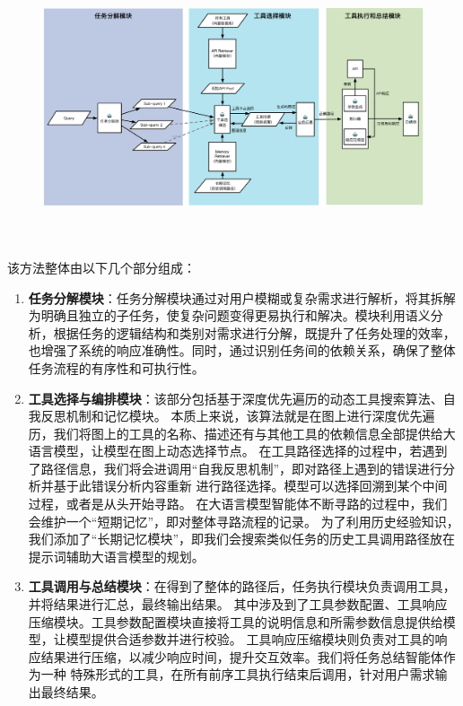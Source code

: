 \begin{figure}[!htp]
  \vspace{1em}
  \centering
  \setlength{\abovecaptionskip}{10pt} %
  \includegraphics[height=8cm]{../assets/ch4-整体框架图-3.pdf}
  \label{fig:ch4-framework}
\end{figure}

该方法整体由以下几个部分组成：

\begin{enumerate}
  \item \textbf{任务分解模块}：任务分解模块通过对用户模糊或复杂需求进行解析，将其拆解为明确且独立的子任务，使复杂问题变得更易执行和解决。模块利用语义分析，根据任务的逻辑结构和类别对需求进行分解，既提升了任务处理的效率，也增强了系统的响应准确性。同时，通过识别任务间的依赖关系，确保了整体任务流程的有序性和可执行性。
  \item \textbf{工具选择与编排模块}：该部分包括基于深度优先遍历的动态工具搜索算法、自我反思机制和记忆模块。
  本质上来说，该算法就是在图上进行深度优先遍历，我们将图上的工具的名称、描述还有与其他工具的依赖信息全部提供给大语言模型，让模型在图上动态选择节点。
  在工具路径选择的过程中，若遇到了路径信息，我们将会进调用“自我反思机制”，即对路径上遇到的错误进行分析并基于此错误分析内容重新
  进行路径选择。模型可以选择回溯到某个中间过程，或者是从头开始寻路。
  在大语言模型智能体不断寻路的过程中，我们会维护一个“短期记忆”，即对整体寻路流程的记录。
  为了利用历史经验知识，我们添加了“长期记忆模块”，即我们会搜索类似任务的历史工具调用路径放在提示词辅助大语言模型的规划。
  \item \textbf{工具调用与总结模块}：在得到了整体的路径后，任务执行模块负责调用工具，并将结果进行汇总，最终输出结果。
  其中涉及到了工具参数配置、工具响应压缩模块。工具参数配置模块直接将工具的说明信息和所需参数信息提供给模型，让模型提供合适参数并进行校验。
  工具响应压缩模块则负责对工具的响应结果进行压缩，以减少响应时间，提升交互效率。我们将任务总结智能体作为一种
  特殊形式的工具，在所有前序工具执行结束后调用，针对用户需求输出最终结果。
\end{enumerate}

